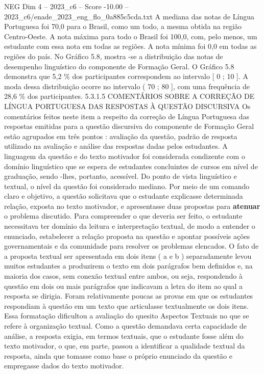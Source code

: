 \begin{textsample}{NEG Dim 4 – 2023\_c6 – Score -10.00 – 2023\_c6/enade\_2023\_eng\_flo\_0a885c5cda.txt}
A mediana das notas de Língua Portuguesa foi 70,0 para o Brasil, como um todo, a mesma obtida na região Centro-Oeste.
A nota máxima para todo o Brasil foi 100,0, com, pelo menos, um estudante com essa nota em todas as regiões.
A nota mínima foi 0,0 em todas as regiões do país.
No Gráfico 5.8, mostra -se a distribuição das notas de desempenho linguístico do componente de Formação Geral.
O Gráfico 5.8 demonstra que 5,2 \% dos participantes correspondem ao intervalo [ 0 ; 10 ].
A moda dessa distribuição ocorre no intervalo ( 70 ; 80 ], com uma frequência de 28,6 \% dos participantes. 5.3.1.5 COMENTÁRIOS SOBRE A CORREÇÃO DE LÍNGUA PORTUGUESA DAS RESPOSTAS À QUESTÃO DISCURSIVA Os comentários feitos neste item a respeito da correção de Língua Portuguesa das respostas emitidas para a questão discursiva do componente de Formação Geral estão agrupados em três pontos : avaliação da questão, padrão de resposta utilizado na avaliação e análise das respostas dadas pelos estudantes.
A linguagem da questão e do texto motivador foi considerada condizente com o domínio linguístico que se espera de estudantes concluintes de cursos em nível de graduação, sendo -lhes, portanto, acessível.
Do ponto de vista linguístico e textual, o nível da questão foi considerado mediano.
Por meio de um comando claro e objetivo, a questão solicitava que o estudante explicasse determinada relação, exposta no texto motivador, e apresentasse duas propostas para \textbf{atenuar} o problema discutido.
Para compreender o que deveria ser feito, o estudante necessitava ter domínio da leitura e interpretação textual, de modo a entender o enunciado, estabelecer a relação proposta na questão e apontar possíveis ações governamentais e da comunidade para resolver os problemas elencados.
O fato de a proposta textual ser apresentada em dois itens ( a e b ) separadamente levou muitos estudantes a produzirem o texto em dois parágrafos bem definidos e, na maioria dos casos, sem conexão textual entre ambos, ou seja, respondendo à questão em dois ou mais parágrafos que indicavam a letra do item ao qual a resposta se dirigia.
Foram relativamente poucas as provas em que os estudantes respondiam à questão em um texto que articulasse textualmente os dois itens.
Essa formatação dificultou a avaliação do quesito Aspectos Textuais no que se refere à organização textual.
Como a questão demandava certa capacidade de análise, a resposta exigia, em termos textuais, que o estudante fosse além do texto motivador, o que, em parte, passou a identificar a qualidade textual da resposta, ainda que tomasse como base o próprio enunciado da questão e empregasse dados do texto motivador.

\end{textsample}
